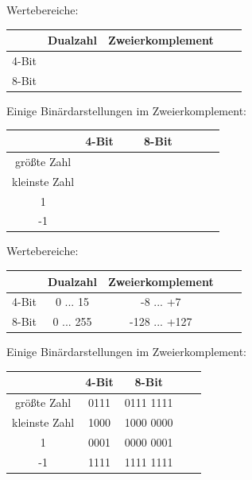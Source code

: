 \documentclass[10pt]{beamer}
\begin{document}
\begin{frame}[fragile]
Wertebereiche:

\begin{tabular}{|c|c|c|c|c|}
\hline  & Dualzahl & Zweierkomplement \\
\hline 4-Bit &   &   \\
\hline 8-Bit &  &    \\
\hline
\end{tabular}  

Einige Binärdarstellungen im Zweierkomplement: 

\begin{tabular}{|c|c|c|c|c|}
\hline  & 4-Bit & 8-Bit \\
\hline größte Zahl & ~~~~ & ~~~~~~~~~~~~   \\
\hline kleinste Zahl &  &    \\
\hline 1 &  &     \\
\hline -1 &  &     \\
\hline
\end{tabular}
\end{frame}


\begin{frame}[fragile]
Wertebereiche:

\begin{tabular}{|c|c|c|c|c|}
\hline  & Dualzahl & Zweierkomplement \\
\hline 4-Bit & 0 ... 15 & -8 ... +7   \\
\hline 8-Bit & 0 ... 255 & -128 ... +127   \\
\hline
\end{tabular} 

Einige Binärdarstellungen im Zweierkomplement: 

\begin{tabular}{|c|c|c|c|c|}
\hline  & 4-Bit & 8-Bit \\
\hline größte Zahl & 0111 & 0111 1111   \\
\hline kleinste Zahl & 1000 & 1000 0000   \\
\hline 1 & 0001 & 0000 0001   \\
\hline -1 & 1111 & 1111 1111   \\
\hline
\end{tabular}
\end{frame}
\end{document}
